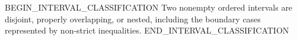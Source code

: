 BEGIN_INTERVAL_CLASSIFICATION
Two nonempty ordered intervals are disjoint, properly overlapping, or nested,
including the boundary cases represented by non-strict inequalities.
END_INTERVAL_CLASSIFICATION
